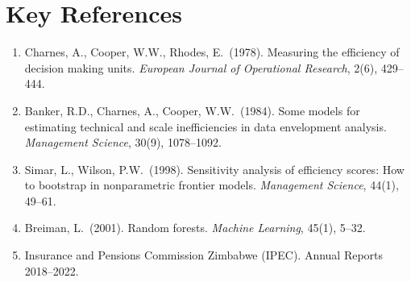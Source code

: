 \documentclass[12pt,a4paper]{article}
\begin{document}
\section{Key References}

\begin{enumerate}
    \item Charnes, A., Cooper, W.W., Rhodes, E.\ (1978). Measuring the efficiency
          of decision making units. \textit{European Journal of Operational Research},
          2(6), 429--444.
    \item Banker, R.D., Charnes, A., Cooper, W.W.\ (1984). Some models for estimating
          technical and scale inefficiencies in data envelopment analysis.
          \textit{Management Science}, 30(9), 1078--1092.
    \item Simar, L., Wilson, P.W.\ (1998). Sensitivity analysis of efficiency scores:
          How to bootstrap in nonparametric frontier models.
          \textit{Management Science}, 44(1), 49--61.
    \item Breiman, L.\ (2001). Random forests. \textit{Machine Learning}, 45(1), 5--32.
    \item Insurance and Pensions Commission Zimbabwe (IPEC). Annual Reports 2018--2022.
\end{enumerate}
\end{document}
